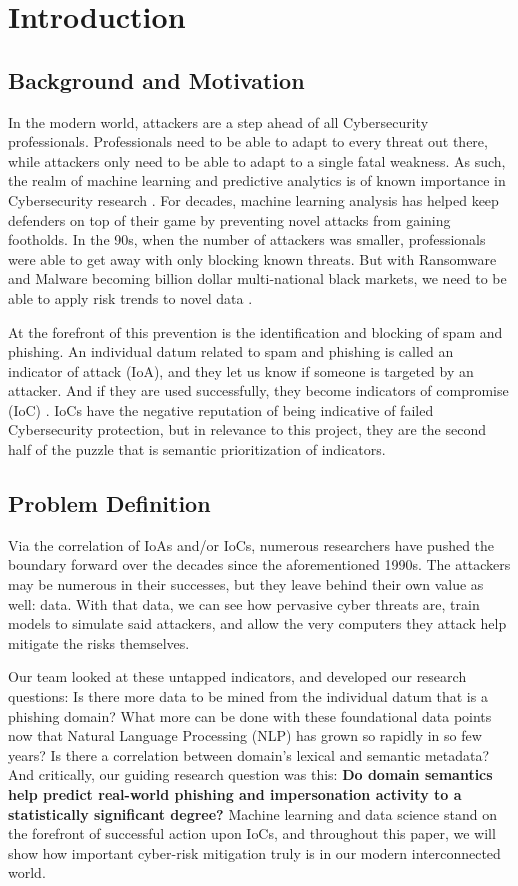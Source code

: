 \documentclass[conference]{IEEEtran}
\begin{document}
\section{Introduction} %
\subsection{Background and Motivation}
In the modern world, attackers are a step ahead of all Cybersecurity professionals. 
Professionals need to be able to adapt to every threat out there, while attackers only need to be able to adapt to a single fatal weakness.
As such, the realm of machine learning and predictive analytics is of known importance in Cybersecurity research \cite{brezeanu_phish_2025}.
For decades, machine learning analysis has helped keep defenders on top of their game by preventing novel attacks from gaining footholds.
In the 90s, when the number of attackers was smaller, professionals were able to get away with only blocking known threats.
But with Ransomware and Malware becoming billion dollar multi-national black markets, we need to be able to apply risk trends to novel data \cite{desolda_apollo_2025}.

At the forefront of this prevention is the identification and blocking of spam and phishing.
An individual datum related to spam and phishing is called an indicator of attack (IoA), and they let us know if someone is targeted by an attacker.
And if they are used successfully, they become indicators of compromise (IoC) \cite{saidani1}.
IoCs have the negative reputation of being indicative of failed Cybersecurity protection, but in relevance to this project, they are the second half of the puzzle that is semantic prioritization of indicators.
\subsection{Problem Definition}
Via the correlation of IoAs and/or IoCs, numerous researchers have pushed the boundary forward over the decades since the aforementioned 1990s.
The attackers may be numerous in their successes, but they leave behind their own value as well: data. 
With that data, we can see how pervasive cyber threats are, train models to simulate said attackers, and allow the very computers they attack help mitigate the risks themselves.

Our team looked at these untapped indicators, and developed our research questions: Is there more data to be mined from the individual datum that is a phishing domain? What more can be done with these foundational data points now that Natural Language Processing (NLP) has grown so rapidly in so few years?
Is there a correlation between domain's lexical and semantic metadata?
And critically, our guiding research question was this: \textbf{Do domain semantics help predict real-world phishing and impersonation activity to a statistically significant degree?}
Machine learning and data science stand on the forefront of successful action upon IoCs, and throughout this paper, we will show how important cyber-risk mitigation truly is in our modern interconnected world.
\end{document}
